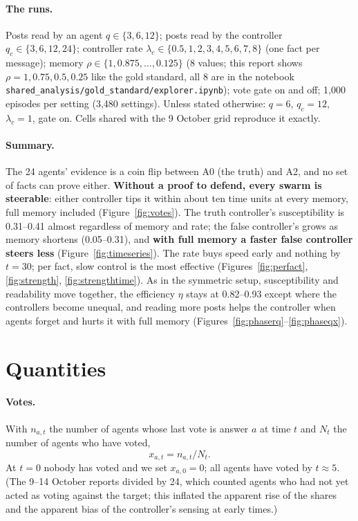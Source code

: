 \documentclass[10pt,a4paper]{article}
\begin{document}
\paragraph{The runs.} Posts read by an agent $q \in \{3, 6, 12\}$; posts read by the controller
$q_c \in \{3, 6, 12, 24\}$; controller rate $\lambda_c \in \{0.5, 1, 2, 3, 4, 5, 6, 7, 8\}$ (one fact per message);
memory $\rho \in \{1, 0.875, \dots, 0.125\}$ (8 values; this report shows $\rho = 1, 0.75, 0.5, 0.25$ like the
gold standard, all 8 are in the notebook \texttt{shared\_analysis/gold\_standard/explorer.ipynb}); vote gate on and
off; 1{,}000 episodes per setting (3{,}480 settings). Unless stated otherwise: $q = 6$, $q_c = 12$, $\lambda_c = 1$,
gate on. Cells shared with the 9 October grid reproduce it exactly.

\paragraph{Summary.} The 24 agents' evidence is a coin flip between A0 (the truth) and A2, and no set of facts can
prove either. \textbf{Without a proof to defend, every swarm is steerable}: either controller tips it within about
ten time units at every memory, full memory included (Figure~\ref{fig:votes}). The truth controller's susceptibility
is 0.31--0.41 almost regardless of memory and rate; the false controller's grows as memory shortens (0.05--0.31), and
\textbf{with full memory a faster false controller steers less} (Figure~\ref{fig:timeseries}). The rate buys speed early
and nothing by $t = 30$; per fact, slow control is the most effective (Figures~\ref{fig:perfact}, \ref{fig:strength},
\ref{fig:strengthtime}). As in the symmetric setup, susceptibility and readability move together, the efficiency
$\eta$ stays at 0.82--0.93 except where the controllers become unequal, and reading more posts helps the controller
when agents forget and hurts it with full memory (Figures~\ref{fig:phaserq}--\ref{fig:phaseqx}).

\section{Quantities}\label{sec:quantities}

\paragraph{Votes.} With $n_{a,t}$ the number of agents whose last vote is answer $a$ at time $t$ and $N_t$ the
number of agents who have voted,
\begin{equation}\label{eq:share}
x_{a,t} = n_{a,t}/N_t .
\end{equation}
At $t = 0$ nobody has voted and we set $x_{a,0} = 0$; all agents have voted by $t \approx 5$. (The 9--14 October reports divided by 24, which counted agents who had
not yet acted as voting against the target; this inflated the apparent rise of the shares and the apparent bias of
the controller's sensing at early times.)
\end{document}
